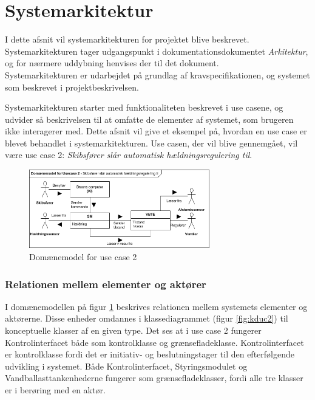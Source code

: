 \section{Systemarkitektur}
\label{ch:systemarkitektur}
I dette afsnit vil systemarkitekturen for projektet blive beskrevet. Systemarkitekturen tager udgangspunkt i dokumentationsdokumentet \textit{Arkitektur}, og for nærmere uddybning henvises der til det dokument.\\
Systemarkitekturen er udarbejdet på grundlag af kravspecifikationen, og systemet som beskrevet i projektbeskrivelsen.

Systemarkitekturen starter med funktionaliteten beskrevet i use casene, og udvider så beskrivelsen til at omfatte de elementer af systemet, som brugeren ikke interagerer med. Dette afsnit vil give et eksempel på, hvordan en use case er blevet behandlet i systemarkitekturen. Use casen, der vil blive gennemgået, vil være use case 2: \textit{Skibsfører slår automatisk hældningsregulering til}.

\begin{figure}[H]
\centering
\includegraphics[width=0.7\textwidth]{billeder/Systemarkitektur/DM_UC2}
\caption{Domænemodel for use case 2}
\label{fig:dmuc2}
\end{figure}

\subsubsection{Relationen mellem elementer og aktører}
I domænemodellen på figur \ref{fig:dmuc2} beskrives relationen mellem systemets elementer og aktørerne. Disse enheder omdannes i klassediagrammet (figur \ref{fig:kduc2}) til konceptuelle klasser af en given type. Det ses at i use case 2 fungerer Kontrolinterfacet både som kontrolklasse og grænsefladeklasse. Kontrolinterfacet er kontrolklasse fordi det er initiativ- og beslutningstager til den efterfølgende udvikling i systemet. Både Kontrolinterfacet, Styringsmodulet og Vandballasttankenhederne fungerer som grænsefladeklasser, fordi alle tre klasser er i berøring med en aktør.\\


